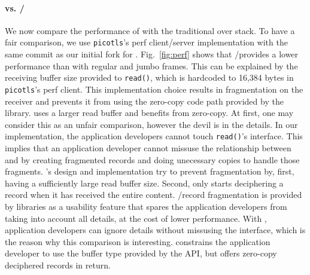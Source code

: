 \paragraph*{\tcpls vs. \tls/\tcp} We now compare the performance of \tcpls with
the traditional \tls over \tcp stack. To have a fair comparison, we use
\texttt{picotls}'s perf client/server implementation with the same commit as our initial fork for \tcpls. Fig.~\ref{fig:perf} shows that \tls/\tcp provides a lower performance than \tcpls with regular and jumbo frames. This can be explained by the receiving buffer size provided to \texttt{read()}, which is hardcoded to 16,384 bytes in \texttt{picotls}'s perf client. This implementation choice results in fragmentation on the receiver and prevents it from using the zero-copy code path provided by the library. \tcpls uses a larger read buffer and benefits from zero-copy. At first, one may consider this as an unfair comparison, however the devil is in the details. In our \tcpls implementation, the application developers cannot touch \texttt{read()}'s interface. This implies that an application developer cannot missuse the relationship between \tls and \tcp by creating fragmented records and doing unecessary copies to handle those fragments. \tcpls's design and implementation try to prevent fragmentation by, first, having a sufficiently large read buffer size. Second, \tcpls only starts deciphering a record when it has received the entire content. \tls/\tcp record fragmentation is provided by \tls libraries as a usability feature that spares the application developers from taking into account all \tls details, at the cost of lower performance. With \tcpls, application developers can ignore \tls details without missusing the interface, which is the reason why this comparison is interesting. \tcpls constrains the application developer to use the buffer type provided by the API, but offers zero-copy deciphered records in return.



